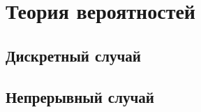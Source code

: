 \documentclass[../konspect.tex]{subfiles}
\begin{document}

\part{Теория вероятностей}


\chapter{Дискретный случай}



\chapter{Непрерывный случай}


\end{document}

